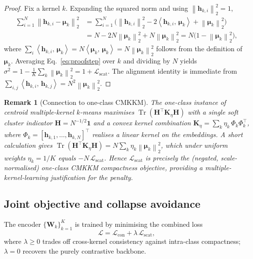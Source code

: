 \documentclass[times, review, 10pt]{elsarticle}
\newtheorem{remark}{Remark}
\newcommand{\norm}[1]{\left\lVert #1 \right\rVert}
\newcommand{\inner}[2]{\left\langle #1,\, #2 \right\rangle}
\newcommand{\Lcross}{\mathcal{L}_{\mathrm{con}}}
\newcommand{\Lscat}{\mathcal{L}_{\mathrm{scat}}}
\newcommand{\Ltot}{\mathcal{L}}
\newcommand{\hh}{\bm{h}}
\newcommand{\WW}{\bm{W}}
\newcommand{\mmu}{\bm{\mu}}
\begin{document}
\begin{proof}
Fix a kernel $k$. Expanding the squared norm and using $\norm{\hh_{k,i}}_2^2=1$,
\begin{align}
\sum_{i=1}^{N}\norm{\hh_{k,i}-\mmu_k}_2^{2}
&=\sum_{i=1}^{N}\!\Big(\norm{\hh_{k,i}}_2^{2}
-2\inner{\hh_{k,i}}{\mmu_k}+\norm{\mmu_k}_2^{2}\Big)\nonumber\\
&=N-2N\norm{\mmu_k}_2^{2}+N\norm{\mmu_k}_2^{2}
=N\big(1-\norm{\mmu_k}_2^{2}\big),
\label{eq:proofstep}
\end{align}
where $\sum_i\inner{\hh_{k,i}}{\mmu_k}=N\inner{\mmu_k}{\mmu_k}=N\norm{\mmu_k}_2^2$
follows from the definition of $\mmu_k$. Averaging Eq.~\eqref{eq:proofstep} over
$k$ and dividing by $N$ yields
$\sigma^2=1-\frac{1}{K}\sum_k\norm{\mmu_k}_2^2=1+\Lscat$. The
alignment identity is immediate from
$\sum_{i,j}\inner{\hh_{k,i}}{\hh_{k,j}}=N^2\norm{\mmu_k}_2^2$.
\end{proof}

\begin{remark}[Connection to one-class CMKKM]
The one-class instance of centroid multiple-kernel $k$-means maximises
$\operatorname{Tr}(\bm{H}^{\!\top}\bm{K}_{\eta}\bm{H})$ with a single soft cluster
indicator $\bm{H}=N^{-1/2}\bm{1}$ and a convex kernel combination
$\bm{K}_{\eta}=\sum_k\eta_k\,\Phi_k\Phi_k^{\!\top}$, where
$\Phi_k=[\hh_{k,1},\dots,\hh_{k,N}]^{\!\top}$ realises a linear kernel on the
embeddings. A short calculation gives
$\operatorname{Tr}(\bm{H}^{\!\top}\bm{K}_{\eta}\bm{H})
=N\sum_k\eta_k\norm{\mmu_k}_2^2$, which under uniform weights
$\eta_k=1/K$ equals $-N\,\Lscat$. Hence $\Lscat$ is precisely the
(negated, scale-normalised) one-class CMKKM compactness objective, providing a
multiple-kernel-learning justification for the penalty.
\end{remark}

\subsection{Joint objective and collapse avoidance}
\label{subsec:joint}

The encoder $\{\WW_k\}_{k=1}^{K}$ is trained by minimising the combined loss
\begin{equation}
\Ltot=\Lcross+\lambda\,\Lscat,
\label{eq:total}
\end{equation}
where $\lambda\ge 0$ trades off cross-kernel consistency against intra-class
compactness; $\lambda=0$ recovers the purely contrastive backbone.
\end{document}
